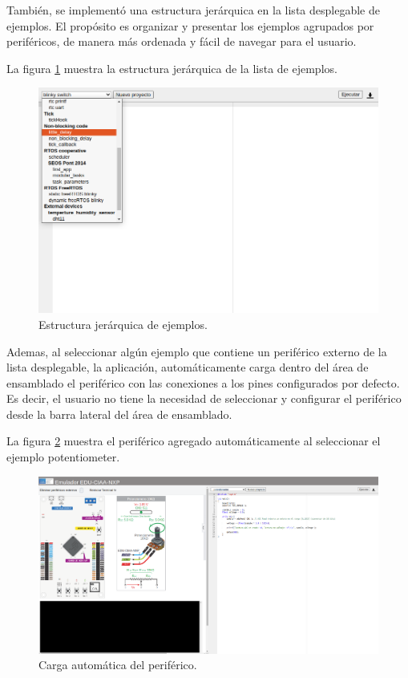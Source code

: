 También, se implementó una estructura jerárquica en la lista desplegable de ejemplos. El propósito es organizar y presentar los ejemplos agrupados por periféricos, de manera más ordenada y fácil de navegar para el usuario.

La figura \ref{fig:listExamples} muestra la estructura jerárquica de la lista de ejemplos.

\begin{figure}[ht]
	\centering
	\includegraphics[scale=.42]{./Figures/listExamples.jpg}
	\caption{Estructura jerárquica de ejemplos. }
	\label{fig:listExamples}
\end{figure}

Ademas, al seleccionar algún ejemplo que contiene un periférico externo de la lista desplegable, la aplicación, automáticamente carga dentro del área de ensamblado el periférico con las conexiones a los pines configurados por defecto. Es decir, el usuario no tiene la necesidad de seleccionar y configurar el periférico desde la barra lateral del área de ensamblado.

La figura \ref{fig:cargarPeriferico} muestra el periférico agregado automáticamente al seleccionar el ejemplo \textquotedbl potentiometer\textquotedbl.

\begin{figure}[ht]
	\centering
	\includegraphics[scale=.21]{./Figures/cargarPeriferico.png}
	\caption{Carga automática del periférico. }
	\label{fig:cargarPeriferico}
\end{figure}



